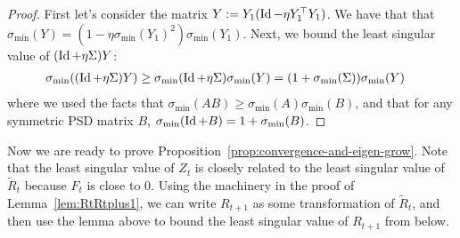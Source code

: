 \begin{proof}
First let's consider the matrix  $Y := Y_1 (\operatorname{Id} - \eta Y_1^{\top}  Y_1) $. We have that that $\sigma_{\min} \left(  Y \right) = \left(1 - \eta \sigma_{\min}(Y_1)^2\right) \sigma_{\min}(Y_1)$. Next, we bound the least singular value of $(\operatorname{Id} + \eta \Sigma)Y$: 
\begin{align*}
\sigma_{\min}((\operatorname{Id} + \eta \Sigma)Y)&\ge \sigma_{\min}(\operatorname{Id} + \eta\Sigma)\sigma_{\min}(Y)= (1+\sigma_{\min}(\Sigma))\sigma_{\min}(Y)
\end{align*}
where we used the facts that $\sigma_{\min}(AB)\ge \sigma_{\min}(A)\sigma_{\min}(B)$, and that for any symmetric PSD matrix $B$, $\sigma_{\min}(\operatorname{Id} + B) = 1 + \sigma_{\min}(B)$. 
\end{proof}
Now we are ready to prove Proposition~\ref{prop:convergence-and-eigen-grow}. Note that the least singular value of $Z_t$ is closely related to the least singular value of $\tilde{R}_t$ because $F_t$ is close to 0. Using the machinery in the proof of Lemma~\ref{lem:RtRtplus1}, we can write $R_{t+1}$ as some transformation of $\tilde{R}_t$, and then use the lemma above to bound the least singular value of $R_{t+1}$ from below. 
